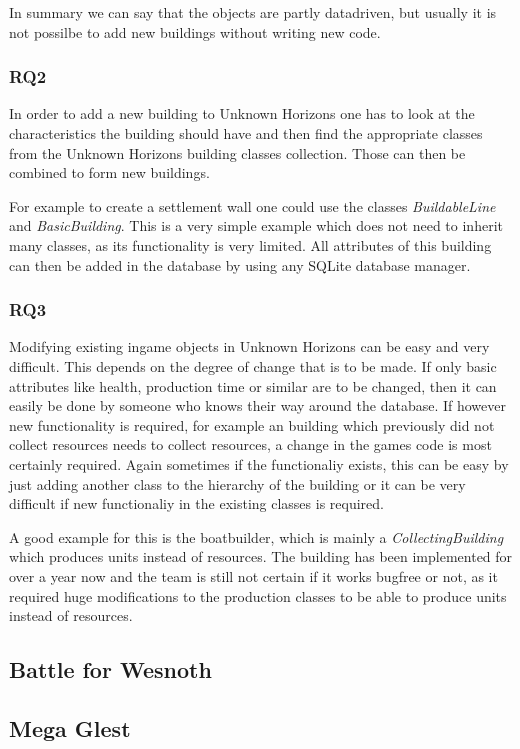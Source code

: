 In summary we can say that the objects are partly datadriven, but usually it is not possilbe to add new buildings
without writing new code.

\subsubsection{RQ2}
In order to add a new building to Unknown Horizons one has to look at the characteristics the building should have and
then find the appropriate classes from the Unknown Horizons building classes collection. Those can then be combined to
form new buildings.

For example to create a settlement wall one could use the classes \textit{BuildableLine} and
\textit{BasicBuilding}. This is a very simple example which does not need to inherit many classes, as its functionality
is very limited. All attributes of this building can then be added in the database by using any SQLite database manager.

\subsubsection{RQ3}
Modifying existing ingame objects in Unknown Horizons can be easy and very difficult. This depends on the degree of
change that is to be made. If only basic attributes like health, production time or similar are to be changed, then it
can easily be done by someone who knows their way around the database. If however new functionality is required, for
example an building which previously did not collect resources needs to collect resources, a change in the games code is
most certainly required. Again sometimes if the functionaliy exists, this can be easy by just adding another class to
the hierarchy of the building or it can be very difficult if new functionaliy in the existing classes is required.

A good example for this is the boatbuilder, which is mainly a \textit{CollectingBuilding} which produces units instead of
resources. The building has been implemented for over a year now and the team is still not certain if it works bugfree
or not, as it required huge modifications to the production classes to be able to produce units instead of resources.


\subsection{Battle for Wesnoth}

\subsection{Mega Glest}

